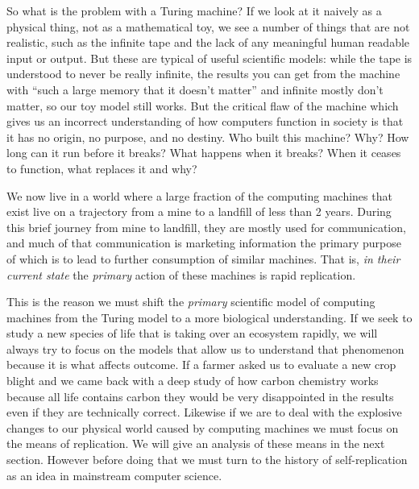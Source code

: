 \documentclass[12pt,a4paper]{amsart}
\numberwithin{equation}{section}
\begin{document}
So what is the problem with a Turing machine? If we look at it naively
as a physical thing, not as a mathematical toy, we see a number of
things that are not realistic, such as the infinite tape and the lack of
any meaningful human readable input or output. But these are typical of
useful scientific models: while the tape is understood to never be
really infinite, the results you can get from the machine with ``such a
large memory that it doesn't matter'' and infinite mostly don't matter,
so our toy model still works. But the critical flaw of the machine which
gives us an incorrect understanding of how computers function in society
is that it has no origin, no purpose, and no destiny. Who built this
machine? Why? How long can it run before it breaks? What happens when it
breaks? When it ceases to function, what replaces it and why?

We now live in a world where a large fraction of the computing machines
that exist live on a trajectory from a mine to a landfill of less than 2
years. During this brief journey from mine to landfill, they are mostly
used for communication, and much of that communication is marketing
information the primary purpose of which is to lead to further
consumption of similar machines. That is, \emph{in their current state}
the \emph{primary} action of these machines is rapid replication.

This is the reason we must shift the \emph{primary} scientific model of
computing machines from the Turing model to a more biological
understanding. If we seek to study a new species of life that is taking
over an ecosystem rapidly, we will always try to focus on the models
that allow us to understand that phenomenon because it is what affects
outcome. If a farmer asked us to evaluate a new crop blight and we came
back with a deep study of how carbon chemistry works because all life
contains carbon they would be very disappointed in the results even if
they are technically correct. Likewise if we are to deal with the
explosive changes to our physical world caused by computing machines we
must focus on the means of replication. We will give an analysis of
these means in the next section. However before doing that we must turn
to the history of self-replication as an idea in mainstream computer
science.
\end{document}
